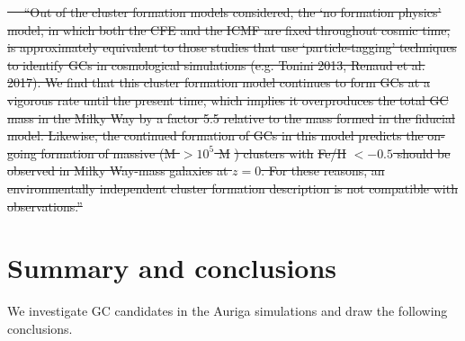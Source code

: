 \documentclass[a4paper,fleqn,usenatbib]{mnras}
\newcommand{\Sun}[0]{\ensuremath{_{\odot}}}
\providecommand{\DIFdel}[1]{{\protect\color{red}\sout{#1}}}                      %
\providecommand{\DIFdelend}{} %
\DeclareRobustCommand{\DIFdelend}{\DIFOaddend \let\includegraphics\DIFOincludegraphics} %
\begin{document}
\DIFdel{\mbox{%
\citet{2019MNRAS.486.5838R}
}\hspace{0pt}%
``Out of the cluster formation models considered, the `no formation physics' model,
in which both the CFE and the ICMF are fixed throughout cosmic time, is
approximately equivalent to those studies  that  use  `particle-tagging'
techniques  to  identify  GCs  in cosmological simulations (e.g. Tonini 2013,
Renaud et al. 2017). We find that this cluster formation model continues to form GCs
at a vigorous rate until the present time, which implies it overproduces
the total GC mass in the Milky Way by a factor
5.5 relative to the mass formed in the fiducial model. Likewise, the continued
formation  of  GCs  in  this  model  predicts  the  on-going  formation
of massive (M $>10^5$ M}%
\DIFdel{) clusters with }%
\DIFdel{Fe/H}%
\DIFdel{$ <-0.5$ should be observed in
Milky Way-mass galaxies at $z=0$. For these reasons, an environmentally independent
cluster formation description is not compatible with observations.''
}\DIFdelend %



\section{Summary and conclusions}
\label{sec:conclusions}

We investigate GC candidates in the Auriga simulations and draw the following
conclusions.
\end{document}
